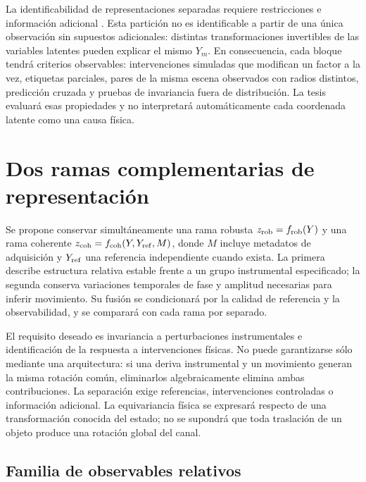 La identificabilidad de representaciones separadas requiere restricciones e
información adicional \citep{Locatello2019Identifiability}. Esta partición no es identificable
a partir de una única observación sin supuestos adicionales: distintas transformaciones invertibles de las variables latentes pueden explicar el mismo $Y_m$. En consecuencia, cada bloque tendrá criterios observables: intervenciones simuladas que modifican un factor a la vez, etiquetas parciales, pares de la misma escena observados con radios distintos, predicción cruzada y pruebas de invariancia fuera de distribución. La tesis evaluará esas propiedades y no interpretará automáticamente cada coordenada latente como una causa física.

\section{Dos ramas complementarias de representación}
\label{sec:two_representation_branches}

Se propone conservar simultáneamente una rama robusta $z_{\rm rob}=f_{\rm rob}(Y)$
y una rama coherente $z_{\rm coh}=f_{\rm coh}(Y,Y_{\rm ref},M)$, donde $M$ incluye
metadatos de adquisición y $Y_{\rm ref}$ una referencia independiente cuando exista.
La primera describe estructura relativa estable frente a un grupo instrumental
especificado; la segunda conserva variaciones temporales de fase y amplitud necesarias
para inferir movimiento. Su fusión se condicionará por la calidad de referencia y
la observabilidad, y se comparará con cada rama por separado.

El requisito deseado es invariancia a perturbaciones instrumentales e identificación
de la respuesta a intervenciones físicas. No puede garantizarse sólo mediante una
arquitectura: si una deriva instrumental y un movimiento generan la misma rotación
común, eliminarlos algebraicamente elimina ambas contribuciones. La separación exige
referencias, intervenciones controladas o información adicional. La equivariancia
física se expresará respecto de una transformación conocida del estado; no se
supondrá que toda traslación de un objeto produce una rotación global del canal.

\subsection{Familia de observables relativos}
\label{sec:representation_v_family}

